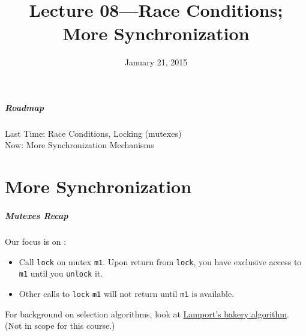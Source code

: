 \documentclass[aspectratio=43]{beamer}
\title{Lecture 08---Race Conditions; More Synchronization}
\date{January 21, 2015}
\newenvironment{changemargin}[1]{%
  \begin{list}{}{%
    \setlength{\topsep}{0pt}%
    \setlength{\leftmargin}{#1}%
    \setlength{\rightmargin}{1em}
    \setlength{\listparindent}{\parindent}%
    \setlength{\itemindent}{\parindent}%
    \setlength{\parsep}{\parskip}%
  }%
  \item[]}{\end{list}}
\begin{document}
\begin{frame}[plain]
  \titlepage
\end{frame}

\begin{frame}
  \frametitle{Roadmap}

  \Large
    \begin{changemargin}{2cm}
      Last Time: Race Conditions, Locking (mutexes)\\[1em]
      Now: More Synchronization Mechanisms
    \end{changemargin}
  
\end{frame}


\part{More Synchronization}
\frame{\partpage}
\begin{frame}
  \frametitle{Mutexes Recap}

  \begin{changemargin}{2.5cm}
     Our focus is on :
  \begin{itemize}
    \item Call {\tt lock} on mutex {\tt m1}. Upon return from
      {\tt lock}, you have exclusive access to {\tt m1} until you
      {\tt unlock} it.
    \item Other calls to {\tt lock} {\tt m1} will not return
      until {\tt m1} is available.
    \end{itemize}
    For background on selection algorithms, look at
      \href{http://en.wikipedia.org/wiki/Lamport\%27s_bakery_algorithm}
      {Lamport's bakery algorithm}. \\ (Not in scope for this
      course.)
  \end{changemargin}
\end{frame}
\end{document}
